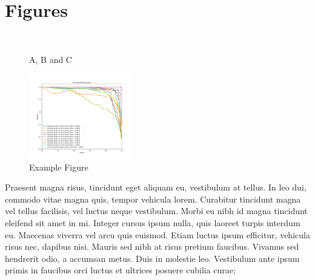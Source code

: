 \documentclass[10pt,conference]{IEEEtran}
\begin{document}
\section{Figures}
  \begin{figure}
    \centering
     \\
    \caption{A, B and C}
    \label{abc}
  \end{figure}

  \begin{figure}
    \centering
    \includegraphics[width=0.4\textwidth]{figures/example.png}
    \caption{Example Figure}
    \label{samplefig}
  \end{figure}

  Praesent magna risus, tincidunt eget aliquam eu, vestibulum at tellus. In leo dui, commodo vitae magna quis, tempor vehicula lorem. Curabitur tincidunt magna vel tellus facilisis, vel luctus neque vestibulum. Morbi eu nibh id magna tincidunt eleifend sit amet in mi. Integer cursus ipsum nulla, quis laoreet turpis interdum eu. Maecenas viverra vel arcu quis euismod. Etiam luctus ipsum efficitur, vehicula risus nec, dapibus nisi. Mauris sed nibh at risus pretium faucibus. Vivamus sed hendrerit odio, a accumsan metus. Duis in molestie leo. Vestibulum ante ipsum primis in faucibus orci luctus et ultrices posuere cubilia curae;
\end{document}
